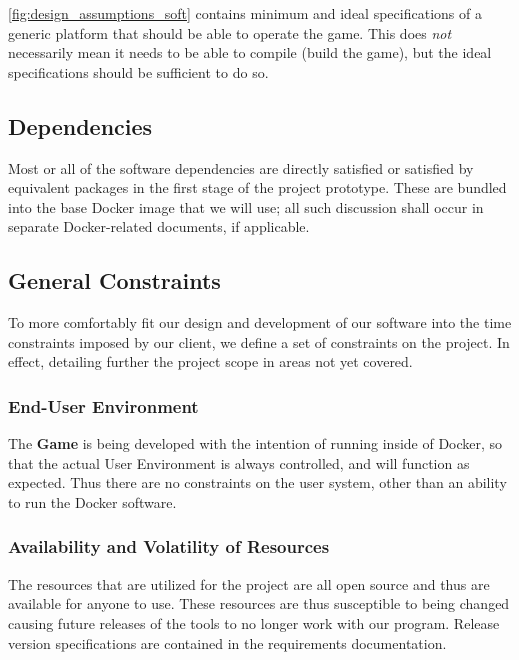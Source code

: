 \documentclass[letterpaper]{article}
\begin{document}
\cref{fig:design_assumptions_soft} contains minimum and ideal
specifications of a generic platform that should be able to
operate the game. This does \emph{not} necessarily mean it needs
to be able to compile (build the game), but the ideal
specifications should be sufficient to do so.

\subsection{Dependencies}
\label{sec:design_dependencies}

Most or all of the software dependencies are directly satisfied
or satisfied by equivalent packages in the first stage of the
project prototype. These are bundled into the base Docker image
that we will use; all such discussion shall occur in separate
Docker-related documents, if applicable.

\subsection{General Constraints}
\label{sec:design_constraints}

To more comfortably fit our design and development of our
software into the time constraints imposed by our client, we
define a set of constraints on the project. In effect, detailing
further the project scope in areas not yet covered.

\subsubsection{End-User Environment}
\label{sec:design_constraints_1}

The \textbf{Game} is being developed with the intention of
running inside of Docker, so that the actual User Environment is
always controlled, and will function as expected. Thus there are
no constraints on the user system, other than an ability to run 
the Docker software.

\subsubsection{Availability and Volatility of Resources}
\label{sec:design_constraints_2}

The resources that are utilized for the project are all open
source and thus are available for anyone to use. These resources
are thus susceptible to being changed causing future releases of
the tools to no longer work with our program. Release version
specifications are contained in the requirements documentation. 
\end{document}
